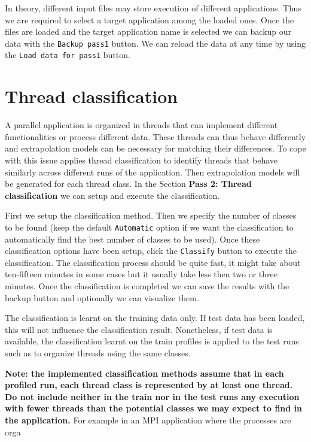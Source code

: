 \documentclass[a4paper, 10pt]{article}
\begin{document}
In theory, different input files may store execution of different applications.
Thus we are required to select a target application among the loaded ones.
Once the files are loaded and the target application name is selected we can backup our data with the \verb!Backup pass1! button.
We can reload the data at any time by using the \verb!Load data for pass1! button.



\section{Thread classification}
\label{sec:classification}

A parallel application is organized in threads that can implement different functionalities or process different data.
These threads can thus behave differently and extrapolation models can be necessary for matching their differences.
To cope with this issue \ex applies thread classification to identify threads that behave similarly across different
runs of the application. Then extrapolation models will be generated for each thread class.
In the Section \textbf{Pass 2: Thread classification} we can setup and execute the classification.

First we setup the classification method. Then we specify the number of classes to be found
(keep the default \verb!Automatic! option if we want the classification to automatically find the best number of classes to be used).
Once these classification options have been setup, click the \verb!Classify! button to execute the classification.
The classification process should be quite fast, it might take about ten-fifteen minutes in some cases but it usually take less then two
or three minutes. Once the classification is completed we can save the results with the backup button and optionally we can visualize them.

The classification is learnt on the training data only. If test data has been loaded, this will not influence the classification result.
Nonetheless, if test data is available, the classification learnt on the train profiles is applied to the test runs
such as to organize threads using the same classes.

\textbf{Note: the implemented classification methods assume that in each profiled run, each thread class is represented by at least one thread.
Do not include neither in the train nor in the test runs any execution with fewer threads than the potential classes we may
expect to find in the application.} For example in an MPI application where the processes are orga
\end{document}
